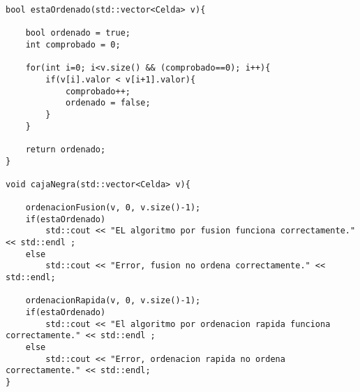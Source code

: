 \begin{lstlisting}
bool estaOrdenado(std::vector<Celda> v){

    bool ordenado = true;
    int comprobado = 0;
    
    for(int i=0; i<v.size() && (comprobado==0); i++){
        if(v[i].valor < v[i+1].valor){
        	comprobado++;
            ordenado = false;
        }
	}
	
    return ordenado;
}

void cajaNegra(std::vector<Celda> v){
	
	ordenacionFusion(v, 0, v.size()-1);
	if(estaOrdenado)
    	std::cout << "EL algoritmo por fusion funciona correctamente." << std::endl ;
    else
    	std::cout << "Error, fusion no ordena correctamente." << std::endl;
    	
	ordenacionRapida(v, 0, v.size()-1);
	if(estaOrdenado)
    	std::cout << "El algoritmo por ordenacion rapida funciona correctamente." << std::endl ;
    else
    	std::cout << "Error, ordenacion rapida no ordena correctamente." << std::endl;
}
\end{lstlisting}